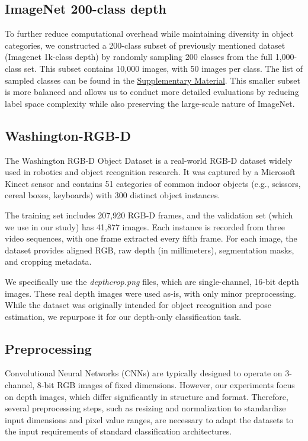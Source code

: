 \subsection{ImageNet 200-class depth}
To further reduce computational overhead while maintaining diversity in object categories, we constructed a 200-class subset of previously mentioned dataset (Imagenet 1k-class depth) by randomly sampling 200 classes from the full 1,000-class set. This subset contains 10,000 images, with 50 images per class. The list of sampled classes can be found in the \href{https://github.com/dariofurlan/vcs-2425-project/}{Supplementary Material}. This smaller subset is more balanced and allows us to conduct more detailed evaluations by reducing label space complexity while also preserving the large-scale nature of ImageNet.

\subsection{Washington-RGB-D}
The Washington RGB-D Object Dataset \cite{washington-rgbd} is a real-world RGB-D dataset widely used in robotics and object recognition research. It was captured by a Microsoft Kinect sensor and contains 51 categories of common indoor objects (e.g., scissors, cereal boxes, keyboards) with 300 distinct object instances.

The training set includes 207,920 RGB-D frames, and the validation set (which we use in our study) has 41,877 images. Each instance is recorded from three video sequences, with one frame extracted every fifth frame. For each image, the dataset provides aligned RGB, raw depth (in millimeters), segmentation masks, and cropping metadata.

We specifically use the \textit{depthcrop.png} files, which are single-channel, 16-bit depth images. These real depth images were used as-is, with only minor preprocessing. While the dataset was originally intended for object recognition and pose estimation, we repurpose it for our depth-only classification task. 

\subsection{Preprocessing}

Convolutional Neural Networks (CNNs) are typically designed to operate on 3-channel, 8-bit RGB images of fixed dimensions. However, our experiments focus on depth images, which differ significantly in structure and format. Therefore, several preprocessing steps, such as resizing and normalization to standardize input dimensions and pixel value ranges, are necessary to adapt the datasets to the input requirements of standard classification architectures.

